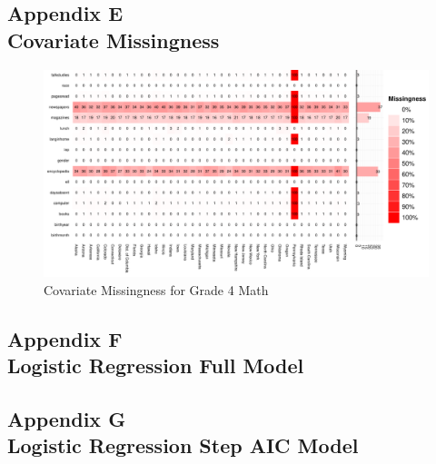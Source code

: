 \documentclass[letterpaper,12pt]{article}
\begin{document}
\cleardoublepage
{}
\subsection*{Appendix E\\Covariate Missingness}
\label{appendixmissing}

\begin{figure}[h]
\begin{center}
\includegraphics[width=\textwidth]{../Figures/g4mathmissing.pdf}
\caption{Covariate Missingness for Grade 4 Math}
\label{fig:g4math:missing}
\end{center}
\end{figure}


\cleardoublepage
{}
\subsection*{Appendix F\\Logistic Regression Full Model}
\label{appendixlogistic}
\begin{singlespace}
 \clearpage
 \clearpage
\end{singlespace}

\cleardoublepage
{}
\subsection*{Appendix G\\Logistic Regression Step AIC Model}
\label{appendixlogisticaic}
\begin{singlespace}
 \clearpage
 \clearpage
\end{singlespace}
\end{document}
